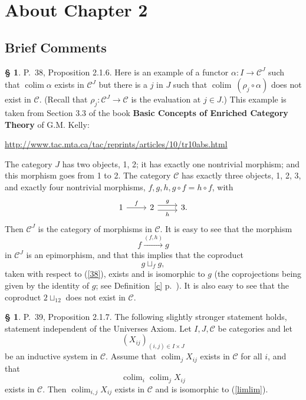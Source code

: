 \documentclass[12pt]{article}%
\theoremstyle{remark}
\theoremstyle{definition}
\newtheorem{s}[thm]{\S}%
\newcommand{\C}{\mathcal C}
\DeclareMathOperator*{\colim}{colim}
\begin{document}

\section{About Chapter 2}

\subsection{Brief Comments}

\begin{s}\label{c38}
P.~38, Proposition 2.1.6. Here is an example of a functor $\alpha:I\to\C^J$ such that $\colim\alpha$ exists in $\C^J$ but there is a $j$ in $J$ such that $\colim\ (\rho_j\circ\alpha)$ does not exist in $\C$. (Recall that $\rho_j:\C^J\to\C$ is the evaluation at $j\in J$.) This example is taken from Section 3.3 of the book \textbf{Basic Concepts of Enriched Category Theory} of G.M. Kelly:%
%
\begin{center}\href{http://www.tac.mta.ca/tac/reprints/articles/10/tr10abs.html}{http://www.tac.mta.ca/tac/reprints/articles/10/tr10abs.html}
\end{center}

The category $J$ has two objects, 1, 2; it has exactly one nontrivial morphism; and this morphism goes from 1 to 2. The category $\C$ has exactly three objects, 1, 2, 3, and exactly four nontrivial morphisms, $f,g,h,g\circ f=h\circ f$, with 
$$
\begin{tikzcd}
1\ar{r}{f}&2\ar[yshift=.7ex]{r}{g}\ar[yshift=-.7ex]{r}[swap]{h}&3.
\end{tikzcd}
$$ 
Then $\C^J$ is the category of morphisms in $\C$. It is easy to see that the morphism 
%
\begin{equation}\label{38}
f\xrightarrow{(f,h)}g 
\end{equation}
%
in $\C^J$ is an epimorphism, and that this implies that the coproduct 
$$
g\sqcup_fg,
$$ 
taken with respect to (\ref{38}), exists and is isomorphic to $g$ (the coprojections being given by the identity of $g$; see Definition~\ref{c} p.~\pageref{c}). It is also easy to see that the coproduct $2\sqcup_12$ does not exist in $\C$.
\end{s}

%

\begin{s} 
P.~39, Proposition 2.1.7. The following slightly stronger statement holds, statement independent of the Universes Axiom. Let $I, J, \C$ be categories and let 
$$
(X_{ij})_{(i,j)\in I\times J}
$$ 
be an inductive system in $\C$. Assume that $\colim_jX_{ij}$ exists in $\C$ for all $i$, and that 
\begin{equation}\label{limlim}
\colim_i\colim_jX_{ij}
\end{equation}
exists in $\C$. Then $\colim_{i,j}X_{ij}$ exists in $\C$ and is isomorphic to (\ref{limlim}).
\end{s}
\end{document}
